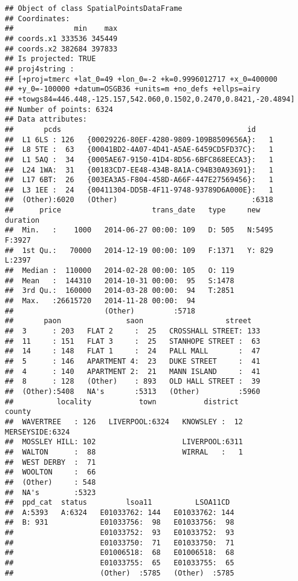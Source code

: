 \documentclass[]{book}
\begin{document}
\begin{verbatim}
## Object of class SpatialPointsDataFrame
## Coordinates:
##              min    max
## coords.x1 333536 345449
## coords.x2 382684 397833
## Is projected: TRUE 
## proj4string :
## [+proj=tmerc +lat_0=49 +lon_0=-2 +k=0.9996012717 +x_0=400000
## +y_0=-100000 +datum=OSGB36 +units=m +no_defs +ellps=airy
## +towgs84=446.448,-125.157,542.060,0.1502,0.2470,0.8421,-20.4894]
## Number of points: 6324
## Data attributes:
##       pcds                                           id      
##  L1 6LS : 126   {00029226-80EF-4280-9809-109B8509656A}:   1  
##  L8 5TE :  63   {00041BD2-4A07-4D41-A5AE-6459CD5FD37C}:   1  
##  L1 5AQ :  34   {0005AE67-9150-41D4-8D56-6BFC868EECA3}:   1  
##  L24 1WA:  31   {00183CD7-EE48-434B-8A1A-C94B30A93691}:   1  
##  L17 6BT:  26   {003EA3A5-F804-458D-A66F-447E27569456}:   1  
##  L3 1EE :  24   {00411304-DD5B-4F11-9748-93789D6A000E}:   1  
##  (Other):6020   (Other)                               :6318  
##      price                     trans_date   type     new      duration
##  Min.   :    1000   2014-06-27 00:00: 109   D: 505   N:5495   F:3927  
##  1st Qu.:   70000   2014-12-19 00:00: 109   F:1371   Y: 829   L:2397  
##  Median :  110000   2014-02-28 00:00: 105   O: 119                    
##  Mean   :  144310   2014-10-31 00:00:  95   S:1478                    
##  3rd Qu.:  160000   2014-03-28 00:00:  94   T:2851                    
##  Max.   :26615720   2014-11-28 00:00:  94                             
##                     (Other)         :5718                             
##       paon               saon                   street    
##  3      : 203   FLAT 2     :  25   CROSSHALL STREET: 133  
##  11     : 151   FLAT 3     :  25   STANHOPE STREET :  63  
##  14     : 148   FLAT 1     :  24   PALL MALL       :  47  
##  5      : 146   APARTMENT 4:  23   DUKE STREET     :  41  
##  4      : 140   APARTMENT 2:  21   MANN ISLAND     :  41  
##  8      : 128   (Other)    : 893   OLD HALL STREET :  39  
##  (Other):5408   NA's       :5313   (Other)         :5960  
##          locality           town           district           county    
##  WAVERTREE   : 126   LIVERPOOL:6324   KNOWSLEY :  12   MERSEYSIDE:6324  
##  MOSSLEY HILL: 102                    LIVERPOOL:6311                    
##  WALTON      :  88                    WIRRAL   :   1                    
##  WEST DERBY  :  71                                                      
##  WOOLTON     :  66                                                      
##  (Other)     : 548                                                      
##  NA's        :5323                                                      
##  ppd_cat  status         lsoa11          LSOA11CD   
##  A:5393   A:6324   E01033762: 144   E01033762: 144  
##  B: 931            E01033756:  98   E01033756:  98  
##                    E01033752:  93   E01033752:  93  
##                    E01033750:  71   E01033750:  71  
##                    E01006518:  68   E01006518:  68  
##                    E01033755:  65   E01033755:  65  
##                    (Other)  :5785   (Other)  :5785
\end{verbatim}
\end{document}
